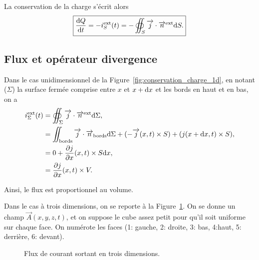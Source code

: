         La conservation de la charge s'écrit alors
        \begin{equation*}
            \boxed{
                \frac{\mathrm{d} Q}{\mathrm{d} t}=-i_{S}^{\text{ext}}(t)=-\oiint_{S}\protect\overrightarrow{{j}}\cdot\protect\overrightarrow{{n}}^{\text{ext}}\mathrm{d} S.
            }
        \end{equation*}

    \subsection{Flux et opérateur \og divergence\fg}

        Dans le cas unidimensionnel de la Figure~\ref{fig:conservation_charge_1d}, en notant ($\Sigma$) la surface fermée comprise entre $x$ et $x+\mathrm{d} x$ et les bords en haut et en bas, on a 
        \begin{align*}
            i_{\Sigma}^{\text{ext}}(t)
            &=
            \oiint_{\Sigma}\protect\overrightarrow{{j}}\cdot\protect\overrightarrow{{n}}^{\text{ext}}\mathrm{d}\Sigma,\\
            &=
            \iint_{\text{bords}}\protect\overrightarrow{{j}}\cdot\protect\overrightarrow{{n}}_{\text{bords}}\mathrm{d}\Sigma+(-\protect\overrightarrow{{j}}(x,t)\times S)+(j(x+\mathrm{d} x,t)\times S),\\
            &= 0 +\frac{\partial j}{\partial x}(x,t)\times S\mathrm{d} x,\\
            &=\frac{\partial j}{\partial x}(x,t) \times V.
        \end{align*}

        Ainsi, le flux est proportionnel au volume.

        Dans le cas à trois dimensions, on se reporte à la Figure~\ref{fig:flux_operateur_divergence_trois_dimensions}. On se donne un champ $\vec{A}(x,y,z,t)$, et on suppose le cube assez petit pour qu'il soit uniforme sur chaque face. On numérote les faces (1: gauche, 2: droite, 3: bas, 4:haut, 5: derrière, 6: devant).

        \begin{figure}
            \centering
            \caption{Flux de courant sortant en trois dimensions.}    
            \label{fig:flux_operateur_divergence_trois_dimensions}
        \end{figure}

